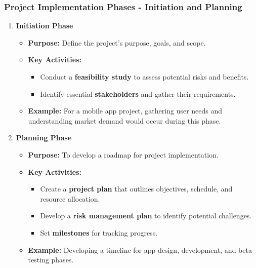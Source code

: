 \documentclass[aspectratio=169]{beamer}
\begin{document}
\begin{frame}[fragile]
    \frametitle{Project Implementation Phases - Initiation and Planning}
    \begin{enumerate}
        \item \textbf{Initiation Phase}
            \begin{itemize}
                \item \textbf{Purpose:} Define the project's purpose, goals, and scope.
                \item \textbf{Key Activities:}
                    \begin{itemize}
                        \item Conduct a \textbf{feasibility study} to assess potential risks and benefits.
                        \item Identify essential \textbf{stakeholders} and gather their requirements.
                    \end{itemize}
                \item \textbf{Example:} For a mobile app project, gathering user needs and understanding market demand would occur during this phase.
            \end{itemize}
        
        \item \textbf{Planning Phase}
            \begin{itemize}
                \item \textbf{Purpose:} To develop a roadmap for project implementation.
                \item \textbf{Key Activities:}
                    \begin{itemize}
                        \item Create a \textbf{project plan} that outlines objectives, schedule, and resource allocation.
                        \item Develop a \textbf{risk management plan} to identify potential challenges.
                        \item Set \textbf{milestones} for tracking progress.
                    \end{itemize}
                \item \textbf{Example:} Developing a timeline for app design, development, and beta testing phases.
            \end{itemize}
    \end{enumerate}
\end{frame}
\end{document}
